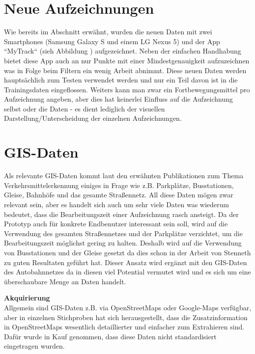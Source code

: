 \clearpage


\section{Neue Aufzeichnungen}
Wie bereits im Abschnitt  erwähnt, wurden die neuen Daten mit zwei Smartphones (Samsung Galaxy S und einem LG Nexus 5) und der App ``MyTrack`` (sieh Abbildung ) aufgezeichnet. Neben der einfachen Handhabung bietet diese App auch an nur Punkte mit einer Mindestgenauigkeit aufzuzeichnen was in Folge beim Filtern ein wenig Arbeit abnimmt. Diese neuen Daten werden hauptsächlich zum Testen verwendet werden und nur ein Teil davon ist in die Trainingsdaten eingeflossen. Weiters kann man zwar ein Fortbewegungsmittel pro Aufzeichnung angeben, aber dies hat keinerlei Einfluss auf die Aufzeichnung selbst oder die Daten - es dient lediglich der visuellen Darstellung/Unterscheidung der einzelnen Aufzeichnungen.


\section{GIS-Daten}
Als relevante GIS-Daten kommt laut den erwähnten Publikationen zum Thema Verkehrsmittelerkennung einiges in Frage wie z.B. Parkplätze, Busstationen, Gleise, Bahnhöfe und das gesamte Straßennetz. All diese Daten mögen zwar relevant sein, aber es handelt sich auch um sehr viele Daten was wiederum bedeutet, dass die Bearbeitungszeit einer Aufzeichnung rasch ansteigt. Da der Prototyp auch für konkrete Endbenutzer interessant sein soll, wird auf die Verwendung des gesamten Straßennetzes und der Parkplätze verzichtet, um die Bearbeitungszeit möglichst gering zu halten. Deshalb wird auf die Verwendung von Busstationen und der Gleise gesetzt da dies schon in der Arbeit von Stenneth \cite{stenneth_transportation_2011} zu guten Resultaten geführt hat. Dieser Ansatz wird ergänzt mit den GIS-Daten des Autobahnnetzes da in diesen viel Potential vermutet wird und es sich um eine überschaubare Menge an Daten handelt.

\textbf{Akquirierung}\\
Allgemein sind GIS-Daten z.B. via OpenStreetMaps oder Google-Maps verfügbar, aber in einzelnen Stichproben hat sich herausgestellt, dass die Zusatzinformation in OpenStreetMaps wesentlich detaillierter und einfacher zum Extrahieren sind. Dafür wurde in Kauf genommen, dass diese Daten nicht standardisiert eingetragen wurden.

